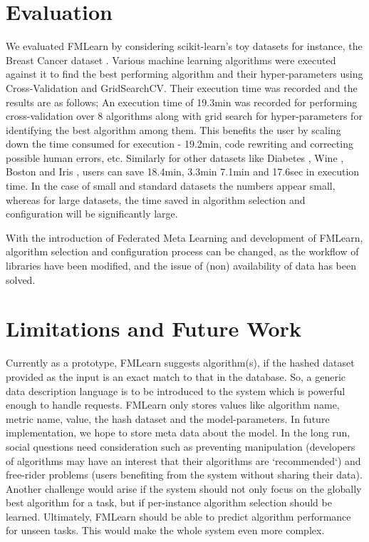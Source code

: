\documentclass{article}
\begin{document}
\section{Evaluation}
We evaluated FMLearn by considering scikit-learn’s toy datasets for instance, the Breast Cancer dataset \cite{brendan-et-al}. Various machine learning algorithms were executed against it to find the best performing algorithm and their hyper-parameters using Cross-Validation and GridSearchCV. Their execution time was recorded and the results are as follows; An execution time of 19.3min was recorded for performing cross-validation over 8 algorithms along with grid search for hyper-parameters for identifying the best algorithm among them. This benefits the user by scaling down the time consumed for execution - 19.2min, code rewriting and correcting possible human errors, etc. Similarly for other datasets like Diabetes \cite{bradley-et-al}, Wine \cite{lichman:m}, Boston \cite{harrison-et-al} and Iris \cite{fisher:r}, users can save 18.4min, 3.3min 7.1min and  17.6sec in execution time. In the case of small and standard datasets the numbers appear small, whereas for large datasets, the time saved in algorithm selection and configuration will be significantly large.

With the introduction of Federated Meta Learning and development of FMLearn, algorithm selection and configuration process can be changed, as the workflow of libraries have been modified, and the issue of (non) availability of data has been solved.

\section{Limitations and Future Work}
Currently as a prototype, FMLearn suggests algorithm(s), if the hashed dataset provided as the input is an exact match to that in the database. So, a generic data description language is to be introduced to the system which is powerful enough to handle requests. FMLearn only stores values like algorithm name, metric name, value, the hash dataset and the model-parameters. In future implementation, we hope to store meta data about the model. In the long run, social questions need consideration such as preventing manipulation (developers of algorithms may have an interest that their algorithms are `recommended`) and free-rider problems (users benefiting from the system without sharing their data). Another challenge would arise if the system should not only focus on the globally best algorithm for a task, but if per-instance algorithm selection should be learned. Ultimately, FMLearn should be able to predict algorithm performance for unseen tasks. This would make the whole system even more complex.
\end{document}
